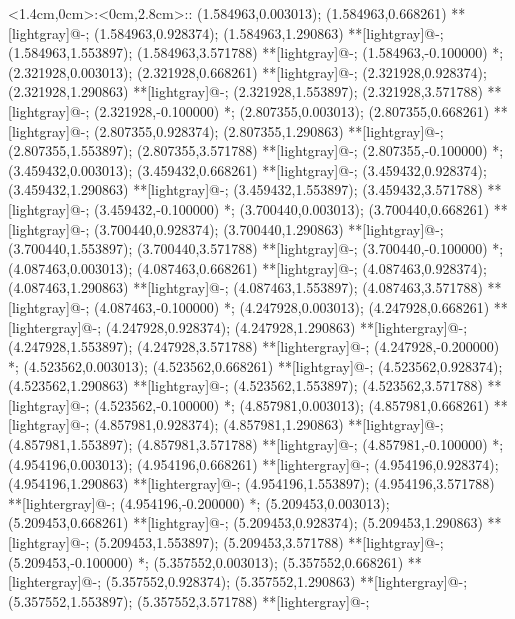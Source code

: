\xy <1.4cm,0cm>:<0cm,2.8cm>::
(1.584963,0.003013); (1.584963,0.668261) **[lightgray]@{-};
(1.584963,0.928374); (1.584963,1.290863) **[lightgray]@{-};
(1.584963,1.553897); (1.584963,3.571788) **[lightgray]@{-};
(1.584963,-0.100000) *{};
(2.321928,0.003013); (2.321928,0.668261) **[lightgray]@{-};
(2.321928,0.928374); (2.321928,1.290863) **[lightgray]@{-};
(2.321928,1.553897); (2.321928,3.571788) **[lightgray]@{-};
(2.321928,-0.100000) *{};
(2.807355,0.003013); (2.807355,0.668261) **[lightgray]@{-};
(2.807355,0.928374); (2.807355,1.290863) **[lightgray]@{-};
(2.807355,1.553897); (2.807355,3.571788) **[lightgray]@{-};
(2.807355,-0.100000) *{};
(3.459432,0.003013); (3.459432,0.668261) **[lightgray]@{-};
(3.459432,0.928374); (3.459432,1.290863) **[lightgray]@{-};
(3.459432,1.553897); (3.459432,3.571788) **[lightgray]@{-};
(3.459432,-0.100000) *{};
(3.700440,0.003013); (3.700440,0.668261) **[lightgray]@{-};
(3.700440,0.928374); (3.700440,1.290863) **[lightgray]@{-};
(3.700440,1.553897); (3.700440,3.571788) **[lightgray]@{-};
(3.700440,-0.100000) *{};
(4.087463,0.003013); (4.087463,0.668261) **[lightgray]@{-};
(4.087463,0.928374); (4.087463,1.290863) **[lightgray]@{-};
(4.087463,1.553897); (4.087463,3.571788) **[lightgray]@{-};
(4.087463,-0.100000) *{};
(4.247928,0.003013); (4.247928,0.668261) **[lightergray]@{-};
(4.247928,0.928374); (4.247928,1.290863) **[lightergray]@{-};
(4.247928,1.553897); (4.247928,3.571788) **[lightergray]@{-};
(4.247928,-0.200000) *{};
(4.523562,0.003013); (4.523562,0.668261) **[lightgray]@{-};
(4.523562,0.928374); (4.523562,1.290863) **[lightgray]@{-};
(4.523562,1.553897); (4.523562,3.571788) **[lightgray]@{-};
(4.523562,-0.100000) *{};
(4.857981,0.003013); (4.857981,0.668261) **[lightgray]@{-};
(4.857981,0.928374); (4.857981,1.290863) **[lightgray]@{-};
(4.857981,1.553897); (4.857981,3.571788) **[lightgray]@{-};
(4.857981,-0.100000) *{};
(4.954196,0.003013); (4.954196,0.668261) **[lightergray]@{-};
(4.954196,0.928374); (4.954196,1.290863) **[lightergray]@{-};
(4.954196,1.553897); (4.954196,3.571788) **[lightergray]@{-};
(4.954196,-0.200000) *{};
(5.209453,0.003013); (5.209453,0.668261) **[lightgray]@{-};
(5.209453,0.928374); (5.209453,1.290863) **[lightgray]@{-};
(5.209453,1.553897); (5.209453,3.571788) **[lightgray]@{-};
(5.209453,-0.100000) *{};
(5.357552,0.003013); (5.357552,0.668261) **[lightergray]@{-};
(5.357552,0.928374); (5.357552,1.290863) **[lightergray]@{-};
(5.357552,1.553897); (5.357552,3.571788) **[lightergray]@{-};
